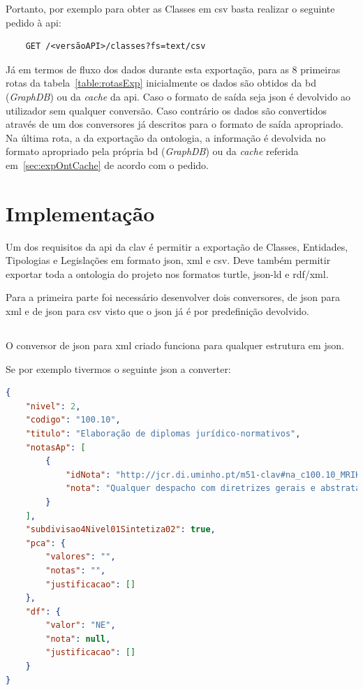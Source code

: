 Portanto, por exemplo para obter as Classes em \acrshort{csv} basta realizar o seguinte pedido à \acrshort{api}:
\footnotesize
\begin{verbatim}
    GET /<versãoAPI>/classes?fs=text/csv
\end{verbatim}
\normalsize

Já em termos de fluxo dos dados durante esta exportação, para as 8 primeiras rotas da tabela~\ref{table:rotasExp} 
inicialmente os dados são obtidos da \acrshort{bd} (\textit{GraphDB}) ou da \textit{cache} da \acrshort{api}. 
Caso o formato de saída seja \acrshort{json} é devolvido ao utilizador sem qualquer conversão. 
Caso contrário os dados são convertidos através de um dos conversores já descritos para o formato de saída apropriado. Na última rota, a da exportação da ontologia, a informação é devolvida no formato apropriado pela própria \acrshort{bd} (\textit{GraphDB}) ou da \textit{cache} referida em~\ref{sec:expOntCache} de acordo com o pedido.

\section{Implementação}

Um dos requisitos da \acrshort{api} da \acrshort{clav} é permitir a exportação de Classes, Entidades, Tipologias e Legislações em formato \acrshort{json}, \acrshort{xml} e \acrshort{csv}. Deve também permitir exportar toda a ontologia do projeto nos formatos \acrshort{turtle}, \acrshort{json-ld} e \acrshort{rdf}/\acrshort{xml}.

Para a primeira parte foi necessário desenvolver dois conversores, de \acrshort{json} para \acrshort{xml} e de \acrshort{json} para \acrshort{csv} visto que o \acrshort{json} já é por predefinição devolvido.

\subsection{}
O conversor de \acrshort{json} para \acrshort{xml} criado funciona para qualquer estrutura em \acrshort{json}.

Se por exemplo tivermos o seguinte \acrshort{json} a converter:
\begin{lstlisting}[language=json, caption=\acrshort{json} exemplo a converter, label=exem:json]
{
    "nivel": 2,
    "codigo": "100.10",
    "titulo": "Elaboração de diplomas jurídico-normativos",
    "notasAp": [
        {
            "idNota": "http://jcr.di.uminho.pt/m51-clav#na_c100.10_MRIKl-RBu_2sz5u9FzPqH",
            "nota": "Qualquer despacho com diretrizes gerais e abstratas"
        }
    ],
    "subdivisao4Nivel01Sintetiza02": true,
    "pca": {
        "valores": "",
        "notas": "",
        "justificacao": []
    },
    "df": {
        "valor": "NE",
        "nota": null,
        "justificacao": []
    }
}
\end{lstlisting}

